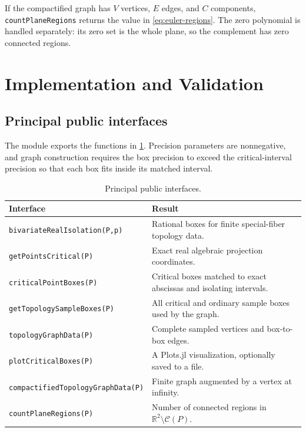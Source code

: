 \documentclass[11pt,a4paper]{article}
\newcommand{\RR}{\mathbb{R}}
\newcommand{\Curve}{\mathcal{C}}
\begin{document}
If the compactified graph has $V$ vertices, $E$ edges, and $C$ components,
\texttt{countPlaneRegions} returns the value in \cref{eq:euler-regions}. The
zero polynomial is handled separately: its zero set is the whole plane, so the
complement has zero connected regions.


\section{Implementation and Validation}

\subsection{Principal public interfaces}

The module exports the functions in \cref{tab:api}. Precision parameters are
nonnegative, and graph construction requires the box precision to exceed the
critical-interval precision so that each box fits inside its matched interval.

\begin{table}[htbp]
\centering
\caption{Principal public interfaces.}
\label{tab:api}
\begin{tabularx}{\textwidth}{@{}p{}X@{}}
\toprule
Interface & Result \\
\midrule
\texttt{bivariateRealIsolation(P,p)}
  & Rational boxes for finite special-fiber topology data. \\
\texttt{getPointsCritical(P)}
  & Exact real algebraic projection coordinates. \\
\texttt{criticalPointBoxes(P)}
  & Critical boxes matched to exact abscissas and isolating intervals. \\
\texttt{getTopologySampleBoxes(P)}
  & All critical and ordinary sample boxes used by the graph. \\
\texttt{topologyGraphData(P)}
  & Complete sampled vertices and box-to-box edges. \\
\texttt{plotCriticalBoxes(P)}
  & A Plots.jl visualization, optionally saved to a file. \\
\texttt{compactifiedTopologyGraphData(P)}
  & Finite graph augmented by a vertex at infinity. \\
\texttt{countPlaneRegions(P)}
  & Number of connected regions in $\RR^2\setminus\Curve(P)$. \\
\bottomrule
\end{tabularx}
\end{table}
\end{document}

